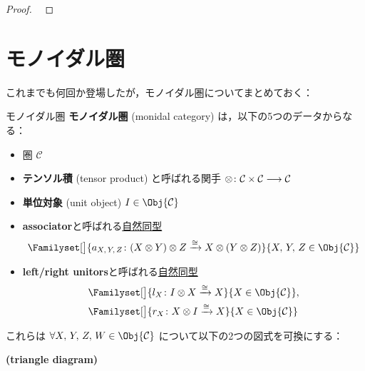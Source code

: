 \documentclass[TQFT_main]{subfiles}
\begin{document}
    \begin{proof}
        ~\cite[Proposition 2.1, p.5]{Mueger1998}
    \end{proof}

    \section{モノイダル圏}

    これまでも何回か登場したが，モノイダル圏についてまとめておく：

    \begin{mydef}[label=redef:monoidal-category,breakable]{モノイダル圏}
        \textbf{モノイダル圏} (monidal category) は，以下の5つのデータからなる：
        \begin{itemize}
            \item 圏 $\mathcal{C}$
            \item \textbf{テンソル積} (tensor product) と呼ばれる関手 $\otimes \colon \mathcal{C} \times \mathcal{C} \longrightarrow \mathcal{C}$
            \item \textbf{単位対象} (unit object) $I \in \Obj{\mathcal{C}}$
            \item \textbf{associator}と呼ばれる\hyperref[def:nat]{自然同型}
            \begin{align}
                \Familyset[\big]{a_{X,\, Y,\, Z} \colon (X \otimes Y) \otimes Z \xrightarrow{\cong} X \otimes (Y \otimes Z)}{X,\, Y,\, Z \in \Obj{\mathcal{C}}}
            \end{align}
            \item \textbf{left/right unitors}と呼ばれる\hyperref[def:nat]{自然同型}
            \begin{align}
                &\Familyset[\big]{l_X \colon I \otimes X \xrightarrow{\cong} X}{X \in \Obj{\mathcal{C}}}, \\
                &\Familyset[\big]{r_X \colon X \otimes I \xrightarrow{\cong} X}{X \in \Obj{\mathcal{C}}}
            \end{align}
            
        \end{itemize}
        これらは $\forall X,\, Y,\, Z,\, W \in \Obj{\mathcal{C}}$ について以下の2つの図式を可換にする：
        \begin{description}
            \item[\textbf{(triangle diagram)}]　
            
            \begin{center}
            \end{center}
            

\end{description}
\end{mydef}
\end{document}
